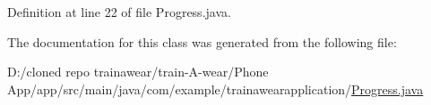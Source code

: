 Definition at line 22 of file Progress.\+java.


\begin{DoxyCode}{0}

\end{DoxyCode}


The documentation for this class was generated from the following file\+:\begin{DoxyCompactItemize}
\item 
D\+:/cloned repo trainawear/train-\/\+A-\/wear/\+Phone App/app/src/main/java/com/example/trainawearapplication/\mbox{\hyperlink{_progress_8java}{Progress.\+java}}\end{DoxyCompactItemize}
